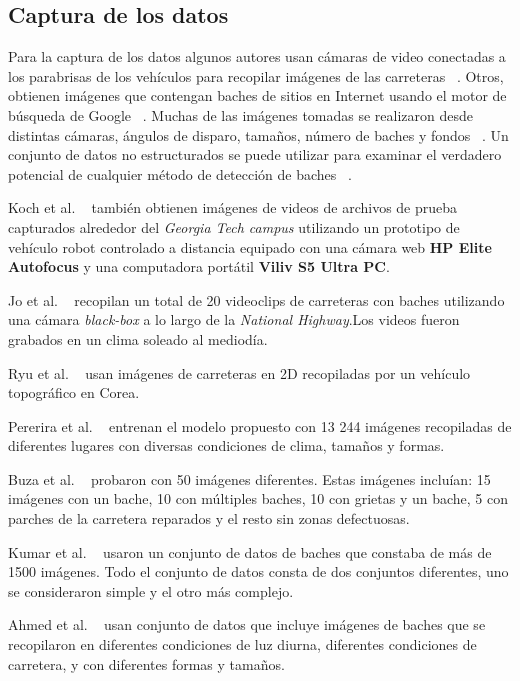	\subsection{Captura de los datos}
	Para la captura de los datos algunos autores usan cámaras de video conectadas a los  parabrisas de los vehículos para 
	recopilar imágenes de las carreteras ~. Otros,  obtienen imágenes que contengan baches de  sitios en 
	Internet usando el motor de búsqueda de Google ~. Muchas de las imágenes tomadas 
	se realizaron desde distintas cámaras, ángulos de disparo, tamaños, número de baches y fondos ~. 
	Un conjunto de datos no estructurados se puede utilizar para examinar el verdadero potencial de cualquier método de 
	detección de baches ~.

	Koch et al. ~ también obtienen  imágenes de videos de archivos de prueba capturados alrededor 
	del \emph{Georgia Tech campus} utilizando un prototipo de vehículo robot controlado a distancia equipado con una cámara web 
	\textbf{HP Elite Autofocus} y una computadora portátil \textbf{Viliv S5 Ultra PC}. 

	Jo et al. ~  recopilan un total de 20 videoclips de carreteras con baches utilizando una cámara 
	\emph{black-box}  a lo largo de la \emph{National Highway}.Los videos fueron grabados en un clima soleado al mediodía.

	Ryu et al. ~ usan imágenes de carreteras en 2D recopiladas por un vehículo topográfico
	en Corea. 

	Pererira et al. ~ entrenan el modelo propuesto  con 13 244 imágenes recopiladas de diferentes
	lugares con diversas condiciones de clima, tamaños y formas.

	Buza et al. ~ probaron con 50 imágenes diferentes. Estas imágenes incluían: 15 imágenes con un bache, 10 con
	múltiples baches, 10 con grietas y un bache, 5 con parches de la carretera reparados y el resto sin zonas defectuosas.

	Kumar et al. ~ usaron un conjunto de datos de baches que constaba de más de 1500 imágenes.
	Todo el conjunto de datos consta de dos conjuntos diferentes, uno se consideraron simple y el otro más complejo.

	Ahmed et al. ~ usan conjunto de datos que incluye imágenes de baches que se recopilaron en diferentes condiciones de luz 
	diurna, diferentes condiciones de carretera, y con diferentes formas y tamaños.


